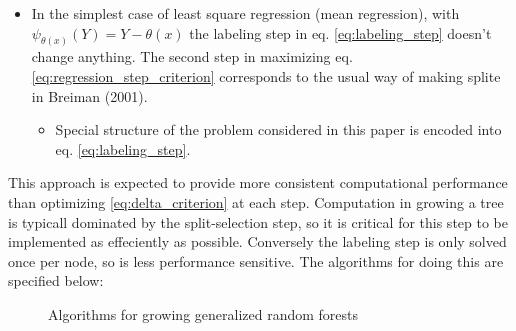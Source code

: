 \begin{itemize}
	\item In the simplest case of least square regression (mean regression), with $\psi_{\theta(x)}(Y) = Y - \theta(x)$ the labeling step in eq. \ref{eq:labeling_step} doesn't change anything. The second step in maximizing eq. \ref{eq:regression_step_criterion} corresponds to the usual way of making splite in Breiman (2001).
	\begin{itemize}
		\item Special structure of the problem considered in this paper is encoded into eq. \ref{eq:labeling_step}.
	\end{itemize}
\end{itemize}
This approach is expected to provide more consistent computational performance than optimizing \ref{eq:delta_criterion} at each step. Computation in growing a tree is typicall dominated by the split-selection step, so it is critical for this step to be implemented as effeciently as possible. Conversely the labeling step is only solved once per node, so is less performance sensitive. The algorithms for doing this are specified below:

\begin{figure}[htbp]
	\centering
	\caption{Algorithms for growing generalized random forests}
\end{figure}

